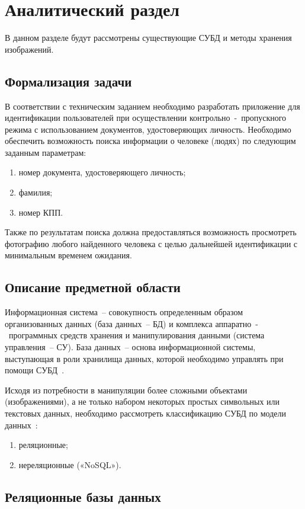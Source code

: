 \chapter{Аналитический раздел}

В данном разделе будут рассмотрены существующие СУБД и методы хранения изображений.

\section{Формализация задачи}

В соответствии с техническим заданием необходимо разработать приложение для идентификации пользователей при осуществлении контрольно~-~пропускного режима с использованием документов, удостоверяющих личность.
Необходимо обеспечить возможность поиска информации о человеке (людях) по следующим заданным параметрам:
\begin{enumerate}
	\item номер документа, удостоверяющего личность;
	\item фамилия;
	\item номер КПП.
\end{enumerate}
Также по результатам поиска должна предоставляться возможность просмотреть фотографию любого найденного человека с целью дальнейшей идентификации с минимальным временем ожидания.

\section{Описание предметной области}

Информационная система~-- совокупность определенным образом организованных данных (база данных~-- БД) и комплекса аппаратно~-~программных средств хранения и манипулирования данными (система управления~-- СУ).
База данных~-- основа информационной системы, выступающая в роли хранилища данных, которой необходимо управлять при помощи СУБД~\cite{baseDB}.

Исходя из потребности в манипуляции более сложными объектами (изображениями), а не только набором некоторых простых символьных или текстовых данных, необходимо рассмотреть классификацию СУБД по модели данных~\cite{highloadApps}:
\begin{enumerate}
	\item реляционные;
	\item нереляционные («NoSQL»).
\end{enumerate}

\section{Реляционные базы данных}

